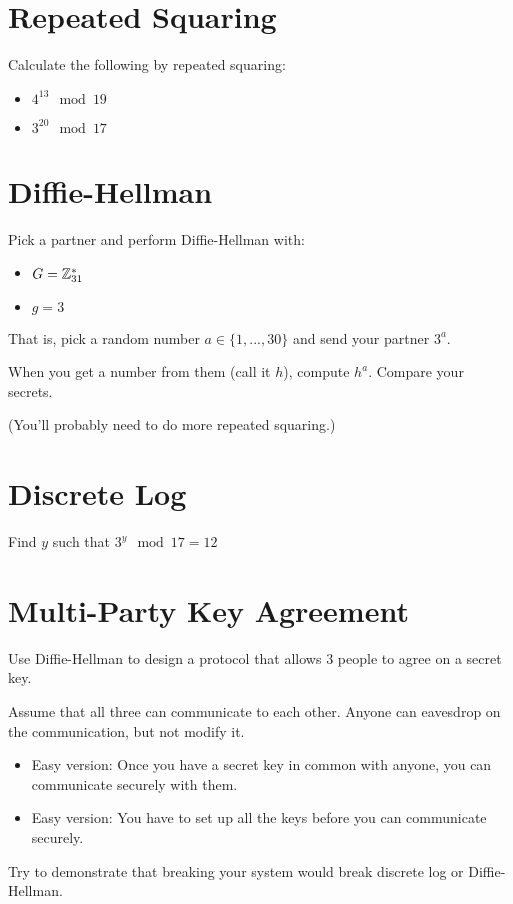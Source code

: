 \documentclass[12pt]{article}
\begin{document}
\section{Repeated Squaring}

Calculate the following by repeated squaring:

\begin{itemize}
\item $4^{13} \mod 19$
\item $3^{20} \mod 17$
\end{itemize}


\section{Diffie-Hellman}

Pick a partner and perform Diffie-Hellman with:

\begin{itemize}
\item $G = \mathbb{Z}_{31}^*$
\item $g = 3$
\end{itemize}

That is, pick a random number $a \in \{1, ..., 30\}$ and send your partner $3^{a}$.

When you get a number from them (call it $h$), compute $h^a$. Compare your secrets.

(You'll probably need to do more repeated squaring.)

\section{Discrete Log}

Find $y$ such that $3^{y} \mod 17 = 12$

\section{Multi-Party Key Agreement}

Use Diffie-Hellman to design a protocol that allows 3 people to agree on a secret key.

Assume that all three can communicate to each other. Anyone can eavesdrop on the communication, but not modify it.

\begin{itemize}
\item Easy version: Once you have a secret key in common with anyone, you can communicate securely with them.
\item Easy version: You have to set up all the keys before you can communicate securely.
\end{itemize}


Try to demonstrate that breaking your system would break discrete log or Diffie-Hellman.
\end{document}
